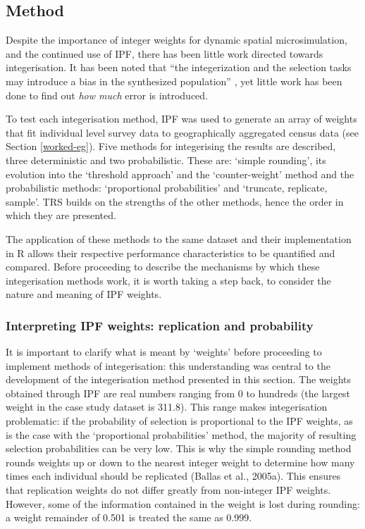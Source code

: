 \subsection{Method}
\label{strategies}
Despite the importance of integer weights for dynamic spatial microsimulation,
and the continued use of IPF, there
has been little work directed towards integerisation. It has been noted that
``the
integerization and the selection tasks may introduce a bias in the synthesized
population'' \citep[10]{Muller2010}, yet little work has been done to find out
\emph{how much} error is introduced.

To test each integerisation method, IPF was used to generate an
array of weights that fit individual level survey data to
geographically aggregated census data (see Section \ref{worked-eg}). Five
methods for
integerising the results are described, three deterministic and two
probabilistic. These are: `simple rounding', its evolution into the `threshold
approach' and the `counter-weight' method and the probabilistic methods:
`proportional probabilities' and `truncate, replicate, sample'. TRS
builds on the strengths of the other methods, hence the order in which they are
presented.

The application of these methods to the same dataset and their implementation in R allows
their respective performance characteristics to be quantified and compared.
Before proceeding to describe the mechanisms by which these integerisation
methods work, it is worth taking a step back, to consider the nature and
meaning of IPF weights.

\subsubsection{Interpreting IPF weights: replication and probability}
It is important to clarify what is meant by `weights' before proceeding to
implement methods of integerisation: this understanding was central to the
development of the integerisation method presented in this section.
The weights obtained through IPF are real numbers ranging from 0 to hundreds
(the largest weight in the case study dataset is 311.8). This range
makes integerisation problematic: if the probability of selection is
proportional to the IPF weights, as is the case with the `proportional
probabilities' method,
the majority of resulting selection probabilities can be very low.
This is why the simple rounding method rounds weights up or down to the nearest
integer weight to determine how many times each individual should be
replicated (Ballas et al., 2005a). This ensures that replication weights do not differ
greatly from non-integer IPF weights. However, some of the information contained
in the weight is lost during rounding: a weight remainder of 0.501 is treated
the same as 0.999.

